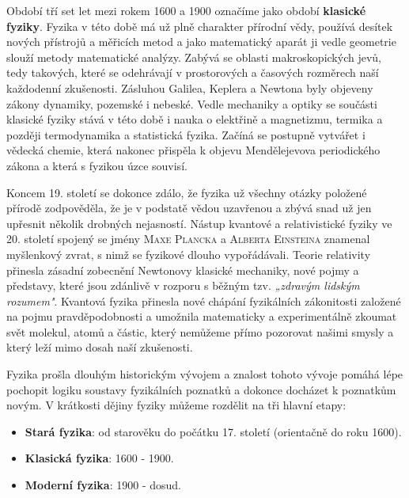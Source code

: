       Období tří set let mezi rokem 1600 a 1900 označíme jako období \textbf{klasické fyziky}.
      Fyzika v této době má už plně charakter přírodní vědy, používá desítek nových přístrojů a
      měřicích metod a jako matematický aparát ji vedle geometrie slouží metody matematické analýzy.
      Zabývá se oblasti makroskopických jevů, tedy takových, které se odehrávají v prostorových a
      časových rozměrech naší každodenní zkušenosti. Zásluhou Galilea, Keplera a Newtona byly
      objeveny zákony dynamiky, pozemské i nebeské. Vedle mechaniky a optiky se součásti klasické
      fyziky stává v této době i nauka o elektřině a magnetizmu, termika a později termodynamika a
      statistická fyzika. Začíná se postupně vytvářet i vědecká chemie, která nakonec přispěla k
      objevu Mendělejevova periodického zákona a která s fyzikou úzce souvisí.

      Koncem 19. století se dokonce zdálo, že fyzika už všechny otázky položené přírodě zodpověděla,
      že je v podstatě vědou uzavřenou a zbývá snad už jen upřesnit několik drobných nejasností.
      Nástup kvantové a relativistické fyziky ve 20. století spojený se jmény \textsc{Maxe Plancka}
      a \textsc{Alberta Einsteina} znamenal myšlenkový zvrat, s nimž se fyzikové dlouho
      vypořádávali. Teorie relativity přinesla zásadní zobecnění Newtonovy klasické mechaniky, nové
      pojmy a představy, které jsou zdánlivě v rozporu s běžným tzv. \emph{„zdravým lidským
      rozumem"}. Kvantová fyzika přinesla nové chápání fyzikálních zákonitosti založené na pojmu
      pravděpodobnosti a umožnila matematicky a experimentálně zkoumat svět molekul, atomů a částic,
      který nemůžeme přímo pozorovat našimi smysly a který leží mimo dosah naší zkušenosti.

      \begin{tcnote}  
        Fyzika prošla dlouhým historickým vývojem a znalost tohoto vývoje pomáhá lépe pochopit
        logiku soustavy fyzikálních poznatků a dokonce docházet k poznatkům novým. V krátkosti
        dějiny fyziky můžeme rozdělit na tři hlavní etapy:
        \begin{itemize}[noitemsep]
          \item \textbf{Stará fyzika}: od starověku do počátku 17. století (orientačně do roku
                1600).
          \item \textbf{Klasická fyzika}: 1600 - 1900.
          \item \textbf{Moderní fyzika}: 1900 - dosud.
        \end{itemize}
      \end{tcnote}

